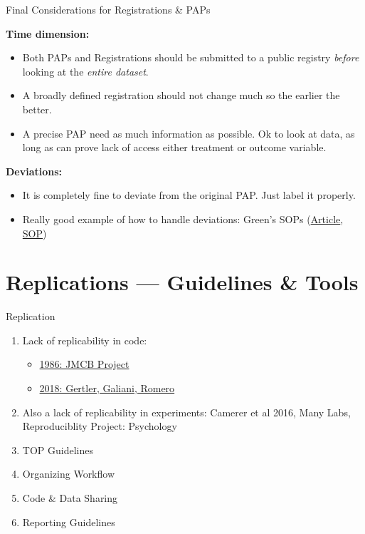 \documentclass{beamer}
\begin{document}
\begin{frame}{Final Considerations for Registrations \& PAPs}

\textbf{Time dimension:}

\begin{itemize}
\item
  Both PAPs and Registrations should be submitted to a public registry
  \emph{before} looking at the \emph{entire dataset}.
\item
  A broadly defined registration should not change much so the earlier
  the better.
\item
  A precise PAP need as much information as possible. Ok to look at
  data, as long as can prove lack of access either treatment or outcome
  variable.
\end{itemize}


\textbf{Deviations:}

\begin{itemize}
\tightlist
\item
  It is completely fine to deviate from the original PAP. Just label it
  properly.
\item
  Really good example of how to handle deviations: Green's SOPs
  (\href{https://www.stat.berkeley.edu/~winston/sop-safety-net.pdf}{Article},
  \href{http://alexandercoppock.com/Green-Lab-SOP/Green_Lab_SOP.html}{SOP})
\end{itemize}

\end{frame}



\section{Replications --- Guidelines \& Tools}
\begin{frame}{Replication}
\begin{enumerate}[<.->]
 \item Lack of replicability in code:
 \begin{itemize}
 \item	\href{http://www.jstor.org/stable/1806061}{1986: JMCB Project} 
 \item  \href{https://www.nature.com/articles/d41586-018-02108-9}{2018: Gertler, Galiani, Romero}
 \end{itemize}
 \item Also a lack of replicability in experiments: Camerer et al 2016, Many Labs, Reproduciblity Project: Psychology 
 \item TOP Guidelines
 \item Organizing Workflow
 \item Code \& Data Sharing
 \item Reporting Guidelines
\end{enumerate}
\end{frame}
\end{document}

